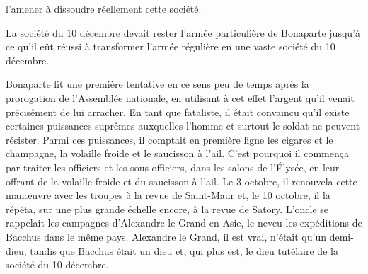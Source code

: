\documentclass[french,twoside]{book} %
\begin{document}
l’amener à dissoudre réellement cette société.\par
La société du 10 décembre devait rester l’armée particulière de Bonaparte jusqu’à ce qu’il eût réussi à transformer l’armée régulière en une vaste société du 10 décembre.\par
Bonaparte fit une première tentative en ce sens peu de temps après la prorogation de l’Assemblée nationale, en utilisant à cet effet l’argent qu’il venait précisément de lui arracher. En tant que fataliste, il était convaincu qu’il existe certaines puissances suprêmes auxquelles l’homme et surtout le soldat ne peuvent résister. Parmi ces puissances, il comptait en première ligne les cigares et le champagne, la volaille froide et le saucisson à l’ail. C’est pourquoi il commença par traiter les officiers et les sous-officiers, dans les salons de l’Élysée, en leur offrant de la volaille froide et du saucisson à l’ail. Le 3 octobre, il renouvela cette manœuvre avec les troupes à la revue de Saint-Maur et, le 10 octobre, il la répéta, sur une plus grande échelle encore, à la revue de Satory. L’oncle se rappelait les campagnes d’Alexandre le Grand en Asie, le neveu les expéditions de Bacchus dans le même pays. Alexandre le Grand, il est vrai, n’était qu’un demi-dieu, tandis que Bacchus était un dieu et, qui plus est, le dieu tutélaire de la société du 10 décembre.\par
\end{document}

